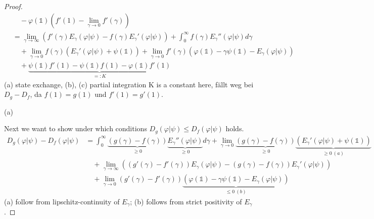 \begin{proof}
\begin{equation}
\begin{split}
    &\quad-\varphi(\mathbb{1})\left( f'(1) - \lim_{\gamma\rightarrow 0} f'(\gamma)\right)\\
    &=\lim_{\gamma\rightarrow\infty}
    \left( f'(\gamma) E_\gamma(\varphi|\psi) - f(\gamma) E_\gamma'(\varphi|\psi)\right)
    +\int_{0}^{\infty} f(\gamma) E_\gamma''(\varphi|\psi)d\gamma\\
    &\quad +\lim_{\gamma\rightarrow 0} f(\gamma) (E_\gamma'(\varphi|\psi) + \psi(\mathbb{1}))
    + \lim_{\gamma\rightarrow 0} f'(\gamma) (\varphi(\mathbb{1})
    - \gamma\psi(\mathbb{1}) -E_\gamma(\varphi|\psi))\\
    &\quad + \underbrace{\psi(\mathbb{1}) f'(1) - \psi(\mathbb{1}) f(1)
    - \varphi(\mathbb{1}) f'(1)}_{=:K}
\end{split}
\end{equation}
(a) state exchange, (b), (c) partial integration
K is a constant here, fällt weg bei $D_g -D_f$, da $f(1) = g(1)$ und
$f'(1) = g'(1)$.
\smallskip

(a)
\bigskip

Next we want to show under which conditions $D_g(\varphi|\psi)\leq D_f(\varphi|\psi)$
holds.
\begin{equation}
\begin{split}
    D_g(\varphi|\psi) - D_f(\varphi|\psi)
    &=\int_{0}^{\infty} \underbrace{(g(\gamma)-f(\gamma))}_{\geq 0}
    \underbrace{E_\gamma''(\varphi|\psi)}_{\geq 0} d\gamma
    + \lim_{\gamma\rightarrow 0} \underbrace{(g(\gamma) - f(\gamma))}_{\geq 0}
    \underbrace{(E_\gamma'(\varphi|\psi) + \psi(\mathbb{1}))}_{\geq 0\: (a)}\\
    &\quad +\lim_{\gamma\rightarrow \infty} ((g'(\gamma)-f'(\gamma)) E_\gamma(\varphi|\psi)
    - (g(\gamma) - f(\gamma)) E_\gamma'(\varphi|\psi))\\
    &\quad +\lim_{\gamma\rightarrow 0} (g'(\gamma) - f'(\gamma))
    \underbrace{(\varphi(\mathbb{1})
    - \gamma\psi(\mathbb{1}) -E_\gamma(\varphi|\psi))}_{\leq 0\: (b)}
\end{split}
\end{equation}
(a) follow from lipschitz-continuity of $E_\gamma$;
(b) follows from strict positivity of $E_\gamma$.
\smallskip


\end{proof}